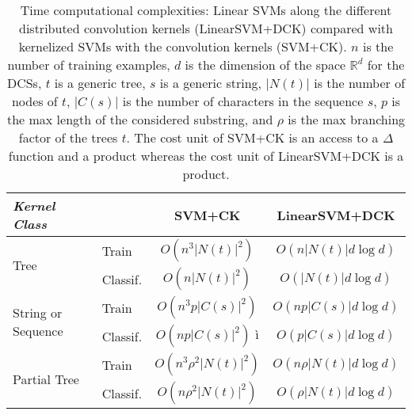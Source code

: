 \documentclass[twoside,11pt]{article}
\def\R{\mathbb{R}}
\def\mynodes#1{N(#1)}
\def\mychar#1{C(#1)}
\def\nnodes#1{|\mynodes{#1}|}
\def\nchar#1{|\mychar{#1}|}
\begin{document}
\begin{table}[!h]
\begin{center}
\begin{tabular}{ ll|c|c|}
\emph{Kernel Class} & &{SVM+CK}  &LinearSVM+DCK \\
\hline
\multirow{2}{*}{Tree} & Train & $O(n^3\nnodes{t}^2)$ &   $O(n\nnodes{t}d\log d)$ \\
 & Classif. & $O(n\nnodes{t}^2)$  & $O(\nnodes{t}d\log d)$ \\
\hline
\multirow{2}{*}{String or Sequence} & Train  & $O(n^3p\nchar{s}^2)$  &$O(np\nchar{s}d\log d)$\\
                                                            & Classif. & $O(np\nchar{s}^2)$  ì& $O(p\nchar{s}d\log d)$\\
\hline
\multirow{2}{*}{Partial Tree}             & Train         & $O(n^3\rho^2\nnodes{t}^2)$  & $O(n\rho\nnodes{t}d\log d)$\\
                                                            & Classif. & $O(n\rho^2\nnodes{t}^2)$  & $O(\rho\nnodes{t}d\log d)$ \\
\hline
\end{tabular}
\end{center}
\caption{Time computational complexities: Linear SVMs along the different distributed convolution kernels (LinearSVM+DCK) compared with  kernelized SVMs with the convolution kernels (SVM+CK). $n$ is the number of  training examples, $d$ is the dimension of the space $\R^d$ for the DCSs, $t$ is a generic tree, $s$ is a generic string, $\nnodes{t}$ is the number of nodes of $t$, $\nchar{s}$ is the number of characters in the sequence $s$, $p$ is the max length of the considered substring, and $\rho$ is the max branching factor of the trees $t$. The cost unit of SVM+CK is an access to a $\Delta$ function and a  product whereas the cost unit of LinearSVM+DCK is a product.}
\label{tab:complexities}
\end{table}
\end{document}
